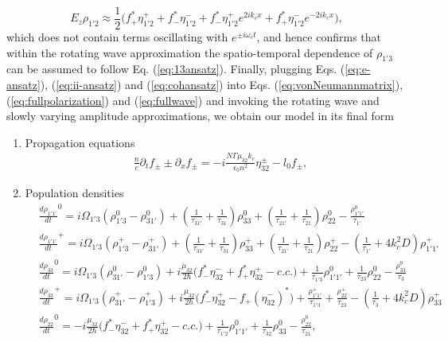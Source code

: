 \documentclass[10pt,letterpaper]{article}
\begin{document}
$$
E_z\rho_{1'2} \approx  \frac{1}{2}\big (f_{+}^*\eta_{1'2}^{+}+f_{-}^*\eta_{1'2}^{-} + f_{-}^* \eta_{1'2}^{+}e^{2ik_c x} +f_{+}^* \eta_{1'2}^{-}e^{-2ik_c x}  \big ),
$$
which does not contain terms oscillating with $e^{\pm i\omega_ct }$, and hence confirms that within the rotating wave approximation the spatio-temporal dependence of $\rho_{1'3}$ can be assumed to follow Eq. (\ref{eq:13ansatz}).
Finally, plugging Eqs. (\ref{eq:e-ansatz}), (\ref{eq:ii-ansatz}) and (\ref{eq:cohansatz}) into Eqs. (\ref{eq:vonNeumannmatrix}), (\ref{eq:fullpolarization}) and (\ref{eq:fullwave})  and invoking the rotating wave and slowly varying amplitude approximations, we obtain our model in its final form
\begin{enumerate}
\item { Propagation equations
\begin{align}
&\frac{n}{c}\partial_t f_{\pm} \pm \partial_{x}f_{\pm} = -i\frac{N \Gamma \mu_{32} k_c}{\epsilon_0 n^2} \eta_{32}^{\pm} - l_0 f_{\pm} \label{eq:rtwave},
\end{align} }
\item{ Population densities
\begin{subequations}
\label{eq:diagonaldm}
\begin{align}
&\frac{d \rho_{1'1'}}{d t}^{0} = i\Omega_{1'3} (\rho_{1'3}^{0} - \rho_{31'}^{0}) + (\frac{1}{\tau_{31'}} + \frac{1}{\tau_{31}})\rho_{33}^{0} 
+ (\frac{1}{\tau_{21'}} + \frac{1}{\tau_{21}})\rho_{22}^{0} - \frac{\rho_{1'1'}^{0}}{\tau_{1'}} \label{eq:rho11-dm} \\
&\frac{d \rho_{1'1'}}{d t}^{+} = i\Omega_{1'3} (\rho_{1'3}^{+} - \rho_{31'}^{+}) + (\frac{1}{\tau_{31'}} + \frac{1}{\tau_{31}})\rho_{33}^{+}  
+ (\frac{1}{\tau_{21'}} + \frac{1}{\tau_{21}})\rho_{22}^{+} - (\frac{1}{\tau_{1'}} + 4k_c^2D )\rho_{1'1'}^{+}  \label{eq:rtpop1grating}\\
&\frac{d \rho_{33}}{d t}^0 = i\Omega_{1'3} (\rho_{31'}^0 - \rho_{1'3}^0) + i\frac{\mu_{32}}{2\hbar} \big (f_{-}^*\eta_{32}^{-}+f_{+}^*\eta_{32}^{+} - c.c. \big )+ \frac{1}{\tau_{1'3}}\rho_{1'1'}^0 +  \frac{1}{\tau_{23}}\rho_{22}^0 - \frac{\rho_{33}^0}{\tau_{3}}  \\
&\frac{d \rho_{33}}{d t}^{+}   = i\Omega_{1'3} (\rho_{31'}^{+} - \rho_{1'3}^{+}) + i\frac{\mu_{32}}{2\hbar}\big ( f_{-}^*\eta_{32}^{+}-f_{+}(\eta_{32}^{-})^* \big ) 
+ \frac{\rho_{1'1'}^+}{\tau_{1'3}} +  \frac{\rho_{22}^+}{\tau_{23}} - (\frac{1}{\tau_{3}} +4k_c^2D) \rho_{33}^+ \label{eq:rtpop3grating}\\
&\frac{d \rho_{22}}{d t}^{0}  = -i\frac{\mu_{32}}{2\hbar} \big (f_{-}^*\eta_{32}^{-}+f_{+}^*\eta_{32}^{+} - c.c. \big ) + \frac{1}{\tau_{1'2}}\rho_{1'1'}^0  +  \frac{1}{\tau_{32}}\rho_{33}^{0} - \frac{\rho_{22}^0}{\tau_{21}} , \\

\end{align}
\end{subequations}}
\end{enumerate}
\end{document}
